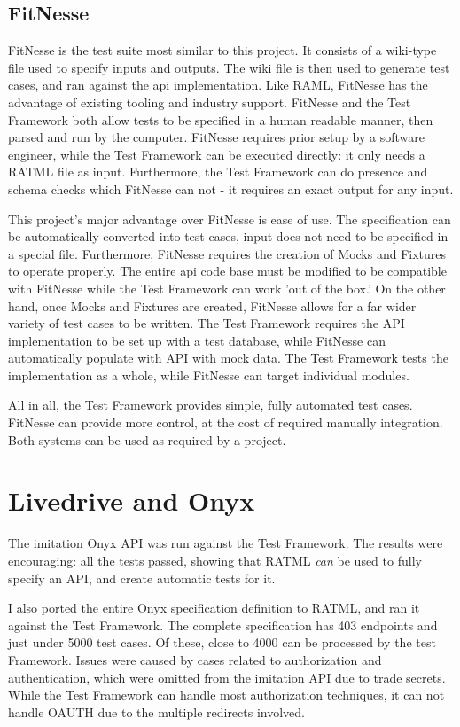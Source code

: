 \subsection{FitNesse}

FitNesse is the test suite most similar to this project. It consists of a wiki-type file used to specify inputs and outputs. The wiki file is then used to generate test cases, and ran against the api implementation. Like RAML, FitNesse has the advantage of existing tooling and industry support. FitNesse and the Test Framework both allow tests to be specified in a human readable manner, then parsed and run by the computer. FitNesse requires prior setup by a software engineer, while the Test Framework can be executed directly: it only needs a RATML file as input. Furthermore, the Test Framework can do presence and schema checks which FitNesse can not - it requires an exact output for any input.

This project's major advantage over FitNesse is ease of use. The specification can be automatically converted into test cases, input does not need to be specified in a special file. Furthermore, FitNesse requires the creation of Mocks and Fixtures to operate properly. The entire api code base must be modified to be compatible with FitNesse while the Test Framework can work 'out of the box.' On the other hand, once Mocks and Fixtures are created, FitNesse allows for a far wider variety of test cases to be written. The Test Framework requires the API implementation to be set up with a test database, while FitNesse can automatically populate with API with mock data. The Test Framework tests the implementation as a whole, while FitNesse can target individual modules.

All in all, the Test Framework provides simple, fully automated test cases. FitNesse can provide more control, at the cost of required manually integration. Both systems can be used as required by a project.

\section{Livedrive and Onyx}

The imitation Onyx API was run against the Test Framework. The results were encouraging: all the tests passed, showing that RATML \emph{can} be used to fully specify an API, and create automatic tests for it. 

I also ported the entire Onyx specification definition to RATML, and ran it against the Test Framework. The complete specification has 403 endpoints and just under 5000 test cases. Of these, close to 4000 can be processed by the test Framework. Issues were caused by cases related to authorization and authentication, which were omitted from the imitation API due to trade secrets. While the Test Framework can handle most authorization techniques, it can not handle OAUTH\cite{rfc6749} due to the multiple redirects involved.

